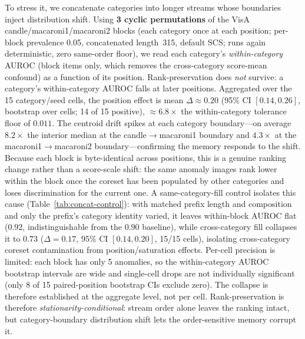 \documentclass[runningheads]{llncs}
\newcommand{\tabref}[1]{Table~\ref{#1}}
\newcommand{\secref}[1]{Section~\ref{#1}}
\begin{document}
To stress it, we concatenate categories into longer streams whose boundaries
inject distribution shift. Using \textbf{3 cyclic permutations} of the VisA
candle/macaroni1/macaroni2 blocks (each category once at each position; per-block
prevalence 0.05, concatenated length~315, default SCS; runs again deterministic,
zero same-order floor), we read each category's \emph{within-category} AUROC
(block items only, which removes the cross-category score-mean confound) as a
function of its position. Rank-preservation does \emph{not} survive: a category's
within-category AUROC falls at later positions. Aggregated over the 15
category/seed cells, the position effect is mean $\Delta \approx 0.20$ (95\% CI
$[0.14, 0.26]$, bootstrap over cells; 14 of 15 positive), $\approx 6.8\times$ the
within-category tolerance floor of $0.011$. The centroid drift spikes at each category boundary---on average
$8.2\times$ the interior median at the candle$\to$macaroni1 boundary and
$4.3\times$ at the macaroni1$\to$macaroni2 boundary---confirming the memory
responds to the shift. Because each block is byte-identical across positions,
this is a genuine ranking change rather than a score-scale shift: the same
anomaly images rank lower within the block once the coreset has been populated by
other categories and loses discrimination for the current one. A same-category-fill
control isolates this cause (\tabref{tab:concat-control}): with matched prefix length
and composition and only the prefix's category identity varied, it leaves within-block
AUROC flat ($0.92$, indistinguishable from the $0.90$ baseline), while cross-category
fill collapses it to $0.73$ ($\Delta = 0.17$, 95\% CI $[0.14, 0.20]$, 15/15 cells),
isolating cross-category coreset contamination from position/saturation effects.
Per-cell precision is limited: each block has only 5 anomalies, so the
within-category AUROC bootstrap intervals are wide and single-cell drops are not
individually significant (only 8 of 15 paired-position bootstrap CIs exclude
zero). The collapse is therefore established at the aggregate level, not per cell. Rank-preservation
is therefore \emph{stationarity-conditional}: stream order alone leaves the
ranking intact, but category-boundary distribution shift lets the order-sensitive
memory corrupt it.

\begin{table}[t]
\centering
\small
\caption{RareCLIP SCS order-sensitivity on focused MVTec AD and VisA slices
(seeds 0--9, $\epsilon{=}0$, length~64, default SCS). Same-order repeats give a
zero noise floor; on both datasets memory and per-image scores are order-sensitive
while AUROC ($\Delta$B-I) is invariant. Under category-boundary distribution shift
this rank-invariance breaks (\secref{sec:order-mechanism}).}
\label{tab:order-mechanism}

\end{table}
\end{document}
